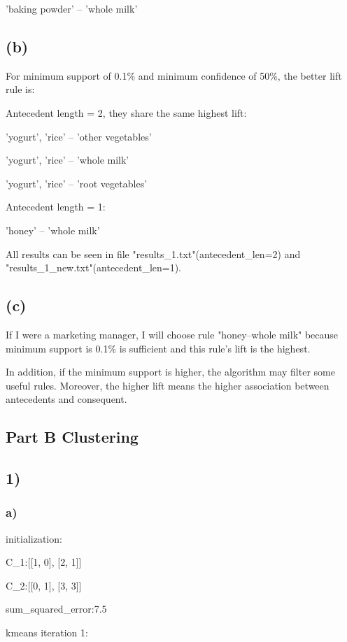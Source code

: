 \documentclass{article}
\begin{document}
'baking powder' -- 'whole milk'

\subsection{(b)}

For minimum support of 0.1\% and minimum confidence of 50\%, the better lift rule is:

Antecedent length = 2, they share the same highest lift:

'yogurt', 'rice' -- 'other vegetables'

'yogurt', 'rice' -- 'whole milk'

'yogurt', 'rice' -- 'root vegetables'

Antecedent length = 1: 

'honey' -- 'whole milk'

All results can be seen in file "results\_1.txt"(antecedent\_len=2) and "results\_1\_new.txt"(antecedent\_len=1).

\subsection{(c)}

If I were a marketing manager, I will choose rule "honey--whole milk" because minimum support is 0.1\% is sufficient and this rule's lift is the highest.

In addition, if the minimum support is higher, the algorithm may filter some useful rules. Moreover, the higher lift means the higher association between antecedents and consequent.

\subsection{Part B Clustering}

\subsection{1)}

\subsubsection{a)}

initialization:

C\_1:[[1, 0], [2, 1]]

C\_2:[[0, 1], [3, 3]]

sum\_squared\_error:7.5

kmeans iteration 1:
\end{document}
